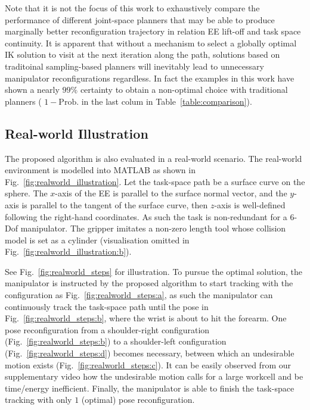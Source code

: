 \documentclass[letterpaper, 10 pt, conference]{ieeeconf}  %
\begin{document}
Note that it is not the focus of this work to exhaustively compare the performance of different joint-space planners that may be able to produce marginally better reconfiguration trajectory in relation EE lift-off and task space continuity. It is apparent that without a mechanism to select a globally optimal IK solution to visit at the next iteration along the path, solutions based on traditoinal sampling-based planners 
will inevitably lead to unnecessary manipulator reconfigurations regardless. In fact the examples in this work have shown a nearly $99\%$ certainty to obtain a non-optimal choice with traditional planners ( $1 - \mbox{Prob.}$ in the last colum in Table~\ref{table:comparison}).




\subsection{Real-world Illustration}\label{section:realworld}
The proposed algorithm is also evaluated in a real-world scenario. 
The real-world environment is modelled into MATLAB as shown in Fig.~\ref{fig:realworld_illustration}. Let the task-space path be a surface curve on the sphere. 
The $x$-axis of the EE is parallel to the surface normal vector, and the $y$-axis is parallel to the tangent of the surface curve, then $z$-axis is well-defined following the right-hand coordinates. As such the task is non-redundant for a $6$-Dof manipulator. The gripper imitates a non-zero length tool whose collision model is set as a cylinder (visualisation omitted in Fig.~\ref{fig:realworld_illustration:b}). 

See Fig.~\ref{fig:realworld_steps} for illustration. To pursue the optimal solution, the manipulator is instructed by the proposed algorithm to start tracking with the configuration as Fig.~\ref{fig:realworld_steps:a}, as such the manipulator can continuously track the task-space path until the pose in Fig.~\ref{fig:realworld_steps:b}, where the wrist is about to hit the forearm. 
One pose reconfiguration from a shoulder-right configuration (Fig.~\ref{fig:realworld_steps:b}) to a shoulder-left configuration (Fig.~\ref{fig:realworld_steps:d}) becomes necessary, between which an undesirable motion exists (Fig.~\ref{fig:realworld_steps:c}). It can be easily observed from our supplementary video how the undesirable motion calls for a large workcell and be time/energy inefficient. Finally, the manipulator is able to finish the task-space tracking with only $1$ (optimal) pose reconfiguration. 
\end{document}
